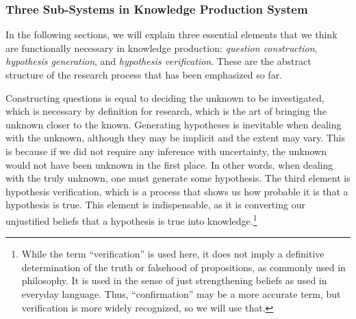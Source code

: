 \documentclass{book}
\begin{document}





\subsubsection{Three Sub-Systems in Knowledge Production System}
In the following sections, we will explain three essential elements that we think are functionally necessary in knowledge production: \textit{question construction}, \textit{hypothesis generation}, and \textit{hypothesis verification}. These are the abstract structure of the research process that has been emphasized so far.

Constructing questions is equal to deciding the unknown to be investigated, which is necessary by definition for research, which is the art of bringing the unknown closer to the known. Generating hypotheses is inevitable when dealing with the unknown, although they may be implicit and the extent may vary. This is because if we did not require any inference with uncertainty, the unknown would not have been unknown in the first place. In other words, when dealing with the truly unknown, one must generate some hypothesis. The third element is hypothesis verification, which is a process that shows us how probable it is that a hypothesis is true. This element is indispensable, as it is converting our unjustified beliefs that a hypothesis is true into knowledge.\footnote{
While the term ``verification'' is used here, it does not imply a definitive determination of the truth or falsehood of propositions, as commonly used in philosophy. It is used in the sense of just strengthening beliefs as used in everyday language. Thus, ``confirmation'' may be a more accurate term, but verification is more widely recognized, so we will use that.
}
\end{document}
